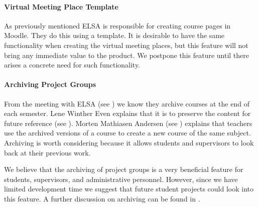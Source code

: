 \paragraph{Virtual Meeting Place Template}
As previously mentioned ELSA is responsible for creating course pages in Moodle. 
They do this using a template. 
It is desirable to have the same functionality when creating the virtual meeting places, but this feature will not bring any immediate value to the product. 
We postpone this feature until there arises a concrete need for such functionality.

\paragraph{Archiving Project Groups}
\label{sub:analysarchiving}
From the meeting with ELSA (see ) we know they archive courses at the end of each semester. 
Lene Winther Even explains that it is to preserve the content for future reference (see ). 
Morten Mathiasen Andersen (see ) explains that teachers use the archived versions of a course to create a new course of the same subject. 
Archiving is worth considering because it allows students and supervisors to look back at their previous work.

We believe that the archiving of project groups is a very beneficial feature for students, supervisors, and administrative personnel.
However, since we have limited development time we suggest that future student projects could look into this feature.
A further discussion on archiving can be found in .


